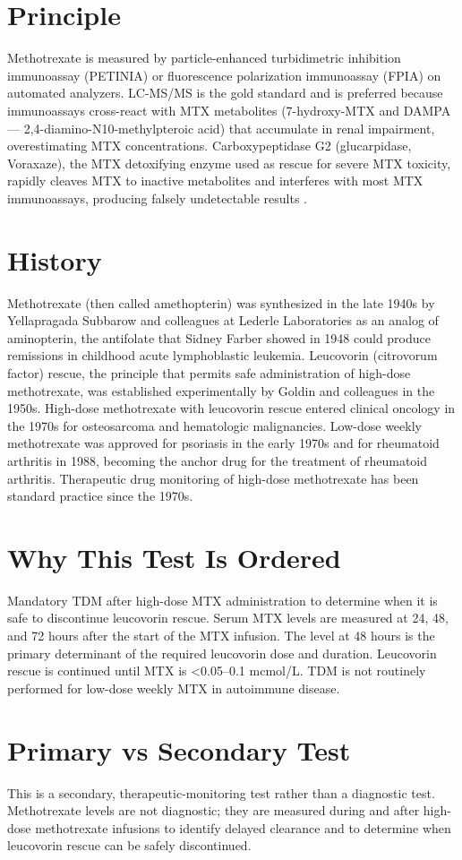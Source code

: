 \section*{Principle}
Methotrexate is measured by particle-enhanced turbidimetric inhibition immunoassay (PETINIA) or fluorescence polarization immunoassay (FPIA) on automated analyzers. LC-MS/MS is the gold standard and is preferred because immunoassays cross-react with MTX metabolites (7-hydroxy-MTX and DAMPA --- 2,4-diamino-N10-methylpteroic acid) that accumulate in renal impairment, overestimating MTX concentrations. Carboxypeptidase G2 (glucarpidase, Voraxaze), the MTX detoxifying enzyme used as rescue for severe MTX toxicity, rapidly cleaves MTX to inactive metabolites and interferes with most MTX immunoassays, producing falsely undetectable results \cite{green2012glucarpidase}.
\section*{History}
Methotrexate (then called amethopterin) was synthesized in the late 1940s by Yellapragada Subbarow and colleagues at Lederle Laboratories as an analog of aminopterin, the antifolate that Sidney Farber showed in 1948 could produce remissions in childhood acute lymphoblastic leukemia. Leucovorin (citrovorum factor) rescue, the principle that permits safe administration of high-dose methotrexate, was established experimentally by Goldin and colleagues in the 1950s. High-dose methotrexate with leucovorin rescue entered clinical oncology in the 1970s for osteosarcoma and hematologic malignancies. Low-dose weekly methotrexate was approved for psoriasis in the early 1970s and for rheumatoid arthritis in 1988, becoming the anchor drug for the treatment of rheumatoid arthritis. Therapeutic drug monitoring of high-dose methotrexate has been standard practice since the 1970s.
\section*{Why This Test Is Ordered}
Mandatory TDM after high-dose MTX administration to determine when it is safe to discontinue leucovorin rescue. Serum MTX levels are measured at 24, 48, and 72 hours after the start of the MTX infusion. The level at 48 hours is the primary determinant of the required leucovorin dose and duration. Leucovorin rescue is continued until MTX is <0.05--0.1 mcmol/L. TDM is not routinely performed for low-dose weekly MTX in autoimmune disease.
\section*{Primary vs Secondary Test}
This is a secondary, therapeutic-monitoring test rather than a diagnostic test. Methotrexate levels are not diagnostic; they are measured during and after high-dose methotrexate infusions to identify delayed clearance and to determine when leucovorin rescue can be safely discontinued.
